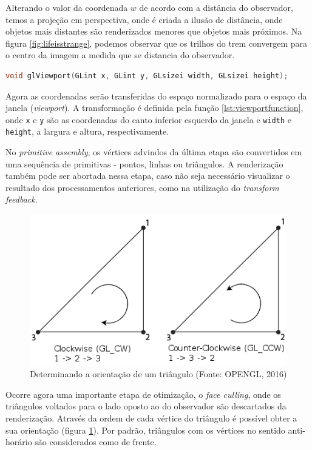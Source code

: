 Alterando o valor da coordenada $w$ de acordo com a distância do observador, temos a projeção em perspectiva, onde é criada a ilusão de distância, onde objetos mais distantes são renderizados menores que objetos mais próximos. Na figura \ref{fig:lifeisstrange}, podemos observar que os trilhos do trem convergem para o centro da imagem a medida que se distancia do observador.

\begin{lstlisting}[language=c,
label={lst:viewportfunction},
caption="Função glViewport"]
	void glViewport(GLint x, GLint y, GLsizei width, GLsizei height);
\end{lstlisting}

Agora as coordenadas serão transferidas do espaço normalizado para o espaço da janela (\textit{viewport}). A transformação é definida pela função \ref{lst:viewportfunction}, onde \lstinline{x} e \lstinline{y} são as coordenadas do canto inferior esquerdo da janela e \lstinline{width} e \lstinline{height}, a largura e altura, respectivamente.

No \textit{primitive assembly}, os vértices advindos da última etapa são convertidos em uma sequência de primitivas - pontos, linhas ou triângulos. A renderização também pode ser abortada nessa etapa, caso não seja necessário visualizar o resultado dos processamentos anteriores, como na utilização do \textit{transform feedback}.

\begin{figure}[H]
	\centering
	\includegraphics[scale=0.6]{imagens/triangle-winding.png}
	\caption[Determinando a orientação de um triângulo]{Determinando a orientação de um triângulo (Fonte: OPENGL, 2016)}
	\label{fig:trianglewinding}
\end{figure}

Ocorre agora uma importante etapa de otimização, o \textit{face culling}, onde os triângulos voltados para o lado oposto ao do observador são descartados da renderização. Através da ordem de cada vértice do triângulo é possível obter a sua orientação (figura \ref{fig:trianglewinding}). Por padrão, triângulos com os vértices no sentido anti-horário são considerados como de frente.

